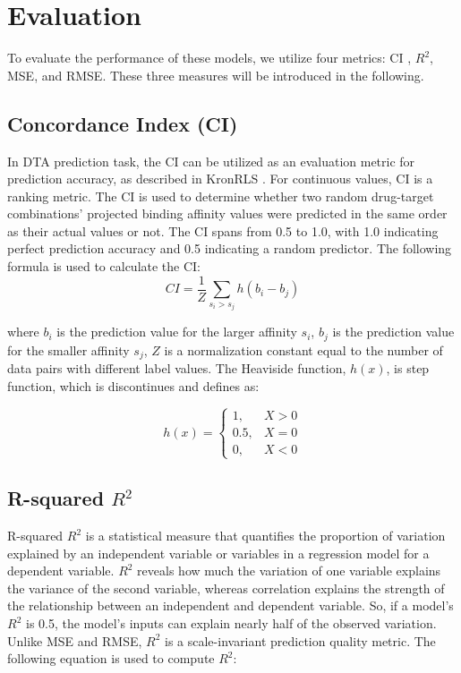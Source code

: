 \section{Evaluation}

To evaluate the performance of these models, we utilize four metrics: CI \cite{gonen2005concordance}, $R^2$, MSE, and RMSE. These three measures will be introduced in the following.

\subsection{Concordance Index (CI)}
In DTA prediction task, the CI can be utilized as an evaluation metric for prediction accuracy, as described in KronRLS \cite{pahikkala2015toward}. For continuous values, CI is a ranking metric. The CI is used to determine whether two random drug-target combinations' projected binding affinity values were predicted in the same order as their actual values or not. The CI spans from 0.5 to 1.0, with 1.0 indicating perfect prediction accuracy and 0.5 indicating a random predictor. The following formula is used to calculate the CI:
\begin{equation}
    CI =  \frac{1}{Z}\sum_{s_{i} > s_{j}}^{}h(b_{i}-b_{j})
\end{equation}

where $b_i$ is the prediction value for the larger affinity $s_i$, $b_j$ is the prediction value for the smaller affinity $s_j$, $Z$ is a normalization constant equal to the number of data pairs with different label values. The Heaviside function, $h(x)$, is \cite{gonen2005concordance} step function, which is discontinues and defines as:

\begin{equation}
    h(x) = 
    \begin{cases}
        1, & \text{$X>0$}\\
        0.5, & \text{$X=0$}\\
        0, & \text{$X<0$}
    \end{cases}
\end{equation}

\subsection{R-squared $R^2$ }
R-squared $R^2$ is a statistical measure that quantifies the proportion of variation explained by an independent variable or variables in a regression model for a dependent variable. $R^2$ reveals how much the variation of one variable explains the variance of the second variable, whereas correlation explains the strength of the relationship between an independent and dependent variable. So, if a model's $R^2$ is 0.5, the model's inputs can explain nearly half of the observed variation. Unlike MSE and RMSE, $R^2$ is a scale-invariant prediction quality metric. The following equation is used to compute $R^2$:

